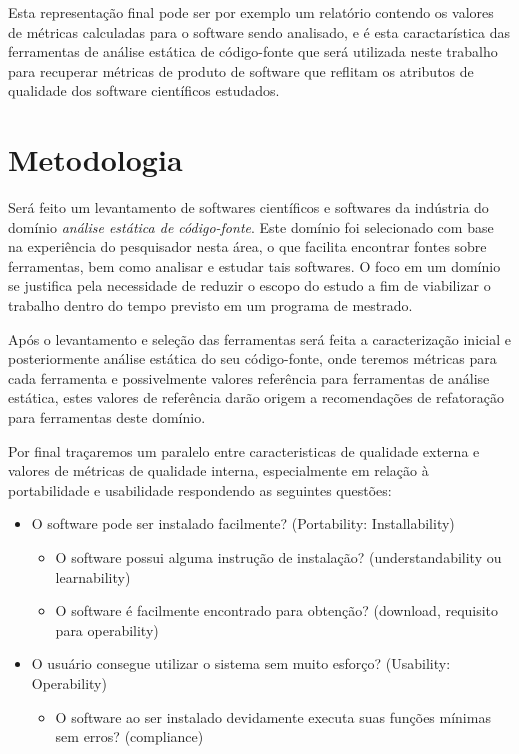 \documentclass[qual, classic, a4paper]{ufbathesis}
\begin{document}
Esta representação final pode ser por exemplo um relatório contendo os valores
de métricas calculadas para o software sendo analisado, e é esta
caractarística das ferramentas de análise estática de código-fonte que será
utilizada neste trabalho para recuperar métricas de produto de software que
reflitam os atributos de qualidade dos software científicos estudados.

\chapter{Metodologia}

Será feito um levantamento de softwares científicos e softwares
da indústria do domínio {\it análise estática de código-fonte}. Este domínio
foi selecionado com base na experiência do pesquisador nesta área, o que
facilita encontrar fontes sobre ferramentas, bem como analisar e estudar
tais softwares. O foco em um domínio se justifica pela necessidade de reduzir
o escopo do estudo a fim de viabilizar o trabalho dentro do tempo previsto em
um programa de mestrado.

Após o levantamento e seleção das ferramentas será feita a caracterização
inicial e posteriormente análise estática do seu código-fonte, onde teremos
métricas para cada ferramenta e possivelmente valores referência para
ferramentas de análise estática, estes
valores de referência darão origem a recomendações de refatoração para
ferramentas deste domínio.

Por final traçaremos um paralelo entre caracteristicas de qualidade externa
e valores de métricas de qualidade interna, especialmente em
relação à portabilidade e usabilidade respondendo as seguintes questões:

\begin{itemize}
  \item O software pode ser instalado facilmente? (Portability: Installability)
    \begin{itemize}
      \item O software possui alguma instrução de instalação? (understandability ou learnability)
      \item O software é facilmente encontrado para obtenção? (download, requisito para operability)
    \end{itemize}
  \item O usuário consegue utilizar o sistema sem muito esforço? (Usability: Operability)
    \begin{itemize}
      \item O software ao ser instalado devidamente executa suas funções mínimas sem erros? (compliance)
    \end{itemize}
\end{itemize}
\end{document}
